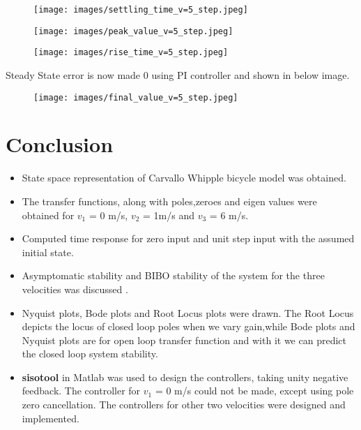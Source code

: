 \documentclass[notitlepage]{article}
\begin{document}
 \begin{figure}[h!]
    \centering
    \texttt{[image: images/settling\_time\_v=5\_step.jpeg]}
     \label{fig:my_label}
 \end{figure}

 \begin{figure}[h!]
    \centering
    \texttt{[image: images/peak\_value\_v=5\_step.jpeg]}
     \label{fig:my_label}
 \end{figure}

 \begin{figure}[h!]
    \centering
    \texttt{[image: images/rise\_time\_v=5\_step.jpeg]}
     \label{fig:my_label}
 \end{figure}

\newpage
Steady State error is now made 0 using PI controller and shown in below image.
 \begin{figure}[h!]
    \centering
    \texttt{[image: images/final\_value\_v=5\_step.jpeg]}
     \label{fig:my_label}
 \end{figure}

\newpage
\section{Conclusion}
\begin{itemize}
\item State space representation of Carvallo Whipple bicycle model was obtained.

\item The transfer functions, along with poles,zeroes and eigen values were obtained for $v_1$ = 0 m/s, $v_2$ = 1m/s and $v_3$ = 6 m/s.

\item Computed time response for zero input and unit step input with the assumed initial state.

\item Asymptomatic stability and BIBO stability of the system for the three velocities was discussed .

\item Nyquist plots, Bode plots and Root Locus plots were drawn. The Root Locus  depicts the locus of closed loop poles when we vary gain,while Bode plots and Nyquist plots are for open loop transfer function and with it we can predict the closed loop system stability.

\item \textbf{sisotool} in Matlab was used to design the controllers, taking unity negative feedback. The controller for  $v_1$ = 0 m/s could not be made, except using pole zero cancellation. The controllers for other two velocities were designed and implemented.

\end{itemize}
 

\end{document}

